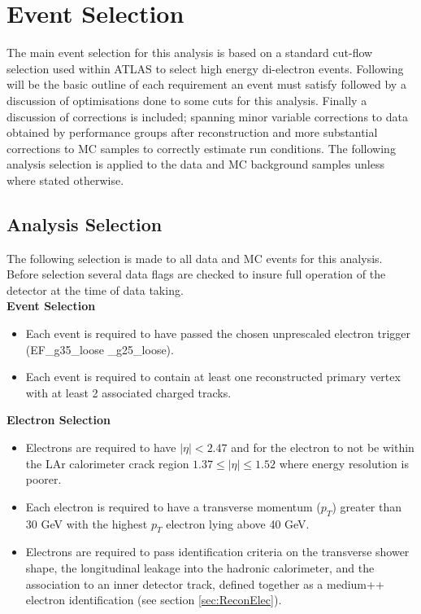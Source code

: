 \chapter{Event Selection}

The main event selection for this analysis is based on a standard cut-flow selection used within ATLAS to select high energy di-electron events. Following will be the basic outline of each requirement an event must satisfy followed by a discussion of optimisations done to some cuts for this analysis. Finally a discussion of corrections is included; spanning minor variable corrections to data obtained by performance groups after reconstruction and more substantial corrections to MC samples to correctly estimate run conditions.
The following analysis selection is applied to the data and MC background samples unless where stated otherwise. 


\section{Analysis Selection}

The following selection is made to all data and MC events for this analysis. Before selection several data flags are checked to insure full operation of the detector at the time of data taking. \\

{\bf Event Selection}
\begin{itemize}
\item Each event is required to have passed the chosen unprescaled electron trigger (EF\_g35\_loose \_g25\_loose).
\item Each event is required to contain at least one reconstructed primary vertex with at least 2 associated charged tracks.
\end{itemize}


{\bf Electron Selection}
\begin{itemize}
\item Electrons are required to have $|\eta| < 2.47$ and for the electron to not be within the LAr calorimeter crack region $1.37 \leq |\eta| \leq 1.52$ where energy resolution is poorer.
\item Each electron is required to have a transverse momentum ($p_{T}$) greater than 30 GeV with the highest $p_{T}$ electron lying above 40 GeV.
\item Electrons are required to pass identification criteria on the transverse shower shape, the longitudinal leakage into the hadronic calorimeter, and the association to an inner detector track, defined together as a medium++ electron identification (see section \ref{sec:ReconElec}).
\end{itemize}


